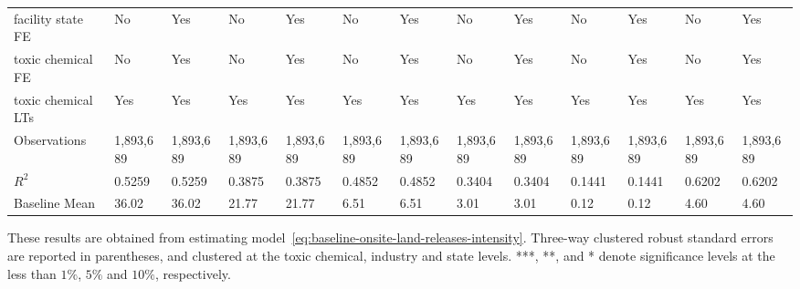 \begin{table}[H]
{\begin{tabular}{@{}lllllllllllll@{}}
            facility state FE                    & No        & Yes       & No        & Yes       & No        & Yes       & No        & Yes       & No        & Yes       & No        & Yes       \\
            toxic chemical FE                    & No        & Yes       & No        & Yes       & No        & Yes       & No        & Yes       & No        & Yes       & No        & Yes       \\
            toxic chemical LTs                   & Yes       & Yes       & Yes       & Yes       & Yes       & Yes       & Yes       & Yes       & Yes       & Yes       & Yes       & Yes       \\\midrule\midrule
            Observations                         & 1,893,689 & 1,893,689 & 1,893,689 & 1,893,689 & 1,893,689 & 1,893,689 & 1,893,689         & 1,893,689         & 1,893,689           & 1,893,689           & 1,893,689              & 1,893,689              \\
            $R^2$                                & 0.5259    & 0.5259    & 0.3875    & 0.3875    & 0.4852    & 0.4852    & 0.3404    & 0.3404    & 0.1441    & 0.1441    & 0.6202                 & 0.6202                 \\
            Baseline Mean                        & 36.02     & 36.02     & 21.77     & 21.77     & 6.51      & 6.51      & 3.01      & 3.01      & 0.12      & 0.12      & 4.60      & 4.60      \\ \bottomrule\bottomrule
        \end{tabular}%
    }
    \begin{minipage}{18cm}
        \vspace{0.05in}
        These results are obtained from estimating model~\ref{eq:baseline-onsite-land-releases-intensity}. Three-way clustered robust standard errors are reported in parentheses, and clustered at the toxic chemical, industry and state levels. ***, **, and * denote significance levels at the less than $1\%$, $5\%$ and $10\%$, respectively.
    \end{minipage}
\end{table}